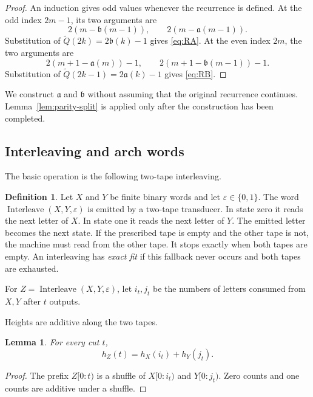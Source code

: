 \documentclass[11pt]{article}
\newtheorem{lemma}[theorem]{Lemma}
\theoremstyle{definition}
\newtheorem{definition}[theorem]{Definition}
\theoremstyle{remark}
\DeclareMathOperator{\Interleave}{Interleave}
\newcommand{\Qt}{\widetilde Q}
\begin{document}
\begin{proof}
An induction gives odd values whenever the recurrence is defined.  At the
odd index \(2m-1\), its two arguments are
\[
 2(m-\mathfrak b(m-1)),\qquad 2(m-\mathfrak a(m-1)).
\]
Substitution of \(\Qt(2k)=2\mathfrak b(k)-1\) gives \eqref{eq:RA}.  At the even index
\(2m\), the two arguments are
\[
 2(m+1-\mathfrak a(m))-1,
 \qquad 2(m+1-\mathfrak b(m-1))-1.
\]
Substitution of \(\Qt(2k-1)=2\mathfrak a(k)-1\) gives \eqref{eq:RB}.
\end{proof}

We construct \(\mathfrak a\) and \(\mathfrak b\) without assuming that the original recurrence
continues.  Lemma~\ref{lem:parity-split} is applied only after the
construction has been completed.

\subsection{Interleaving and arch words}

The basic operation is the following two-tape interleaving.
\begin{definition}
Let \(X\) and \(Y\) be finite binary words and let
\(\varepsilon\in\{0,1\}\).  The word
\(\Interleave(X,Y,\allowbreak\varepsilon)\) is emitted by a two-tape transducer.  In
state zero it reads the next letter of \(X\).  In state one it reads the next
letter of \(Y\).  The emitted letter becomes the next state.  If the
prescribed tape is empty and the other tape is not, the machine must read
from the other tape.  It stops exactly when both tapes are empty.  An
interleaving has \emph{exact fit} if this fallback never occurs and both tapes
are exhausted.
\end{definition}

For \(Z=\Interleave(X,Y,\varepsilon)\), let \(i_t,j_t\) be the numbers of
letters consumed from \(X,Y\) after \(t\) outputs.

Heights are additive along the two tapes.
\begin{lemma}

For every cut \(t\),
\[
 h_Z(t)=h_X(i_t)+h_Y(j_t).
\]
\end{lemma}

\begin{proof}
The prefix \(Z[0:t)\) is a shuffle of \(X[0:i_t)\) and \(Y[0:j_t)\).
Zero counts and one counts are additive under a shuffle.
\end{proof}
\end{document}
